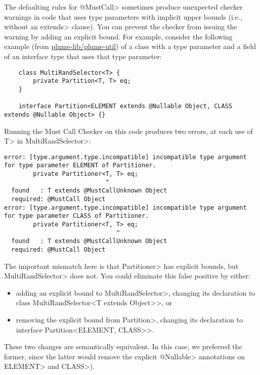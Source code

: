 
The defaulting rules for \<@MustCall> sometimes produce unexpected checker
warnings in code that uses type parameters with implicit upper bounds
(i.e., without an \<extends> clause).  You can prevent the checker from
issuing the warning by adding an explicit bound. For example, consider the following
example (from
\href{https://github.com/plume-lib/plume-util}{plume-lib/plume-util}) of a
class with a type parameter and a field of an interface type that uses that
type parameter:
\begin{Verbatim}
    class MultiRandSelector<T> {
        private Partition<T, T> eq;
    }

    interface Partition<ELEMENT extends @Nullable Object, CLASS extends @Nullable Object> {}
\end{Verbatim}

Running the Must Call Checker on this code produces two errors, at each use
of \<T> in \<MultiRandSelector>:

\begin{smaller}
\begin{Verbatim}
error: [type.argument.type.incompatible] incompatible type argument for type parameter ELEMENT of Partitioner.
        private Partitioner<T, T> eq;
                            ^
  found   : T extends @MustCallUnknown Object
  required: @MustCall Object
error: [type.argument.type.incompatible] incompatible type argument for type parameter CLASS of Partitioner.
        private Partitioner<T, T> eq;
                               ^
  found   : T extends @MustCallUnknown Object
  required: @MustCall Object
\end{Verbatim}
\end{smaller}

The important mismatch here is that \<Partitioner> has explicit bounds, but \<MultiRandSelector>
does not. You could eliminate this false positive by either:
\begin{itemize}
\item adding an explicit bound to \<MultiRandSelector>, changing its declaration to \<class MultiRandSelector<T extends Object>>, or
\item removing the explicit bound from \<Partition>, changing its declaration to \<interface Partition<ELEMENT, CLASS>>.
\end{itemize}

These two changes are semantically equivalent.  In this case, we preferred
the former, since the latter would remove the explicit \<@Nullable>
annotations on \<ELEMENT> and \<CLASS>).
